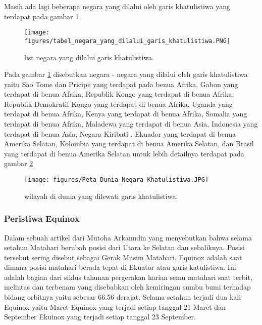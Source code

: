 	Masih ada lagi beberapa negara yang dilalui oleh garis khatulistiwa yang terdapat pada gambar \ref{tabel_negara_yang_dilalui_garis_khatulistiwa}

\begin{figure}[ht]
\centerline{\texttt{[image: figures/tabel\_negara\_yang\_dilalui\_garis\_khatulistiwa.PNG]}}
\caption{list negara yang dilalui garis khatulistiwa.}
\label{tabel_negara_yang_dilalui_garis_khatulistiwa}
\end{figure}

	Pada gambar \ref{tabel_negara_yang_dilalui_garis_khatulistiwa} disebutkan negara - negara yang dilalui oleh garis khatulistiwa yaitu Sao Tome dan Pricipe yang terdapat pada benua Afrika, Gabon yang terdapat di benua Afrika, Republik Kongo yang terdapat di benua Afrika, Republik Demokratif Kongo yang terdapat di benua Afrika, Uganda yang terdapat di benua Afrika, Kenya yang terdapat di benua Afrika, Somalia yang terdapat di benua Afrika, Maladewa yang terdapat di benua Asia, Indonesia yang terdapat di benua Asia, Negara Kiribati , Ekuador yang terdapat di benua Amerika Selatan, Kolombia 
yang terdapat di benua Amerika Selatan, dan Brasil yang terdapat di benua Amerika Selatan untuk lebih detailnya terdapat pada gambar \ref{Peta_Dunia_Negara_Khatulistiwa}
	
\begin{figure}[ht]
\centerline{\texttt{[image: figures/Peta\_Dunia\_Negara\_Khatulistiwa.JPG]}}
\caption{wilayah di dunia yang dilewati garis khatulistiwa.}
\label{Peta_Dunia_Negara_Khatulistiwa}
\end{figure}

\subsubsection {Peristiwa Equinox}

	Dalam sebuah artikel dari Mutoha Arkanudin yang menyebutkan bahwa selama setahun Matahari berubah posisi dari Utara ke Selatan dan sebaliknya. 
Posisi tersebut sering disebut sebagai Gerak Musim Matahari. Equinox adalah saat dimana posisi matahari berada tepat di Ekuator atau garis katulistiwa. 
Ini adalah bagian dari siklus tahunan pergerakan harian semu matahari saat terbit, melintas dan terbenam yang disebabkan oleh kemiringan sumbu bumi
terhadap bidang orbitnya yaitu sebesar 66.56 derajat. Selama setahun terjadi dua kali Equinox yaitu Maret Equinox yang terjadi setiap tanggal 21 Maret dan September
Ekuinox yang terjadi setiap tanggal 23 September. 

